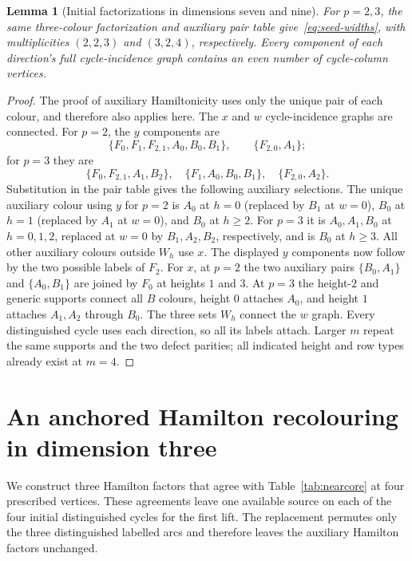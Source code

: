 \documentclass[11pt,reqno]{amsart}
\numberwithin{equation}{section}
\newtheorem{lemma}[theorem]{Lemma}
\theoremstyle{definition}
\theoremstyle{remark}
\begin{document}
\begin{lemma}[Initial factorizations in dimensions seven and nine]\label{lem:small-seed}
For $p=2,3$, the same three-colour factorization and auxiliary pair table
give~\eqref{eq:seed-widths}, with multiplicities $(2,2,3)$ and $(3,2,4)$,
respectively. Every component of each direction's full cycle-incidence graph
contains an even number of cycle-column vertices.
\end{lemma}
\begin{proof}
The proof of auxiliary Hamiltonicity uses only the unique pair of each colour,
and therefore also applies here. The $x$ and $w$ cycle-incidence graphs are connected.
For $p=2$, the $y$ components are
\[
 \{F_0,F_1,F_{2,1},A_0,B_0,B_1\},\qquad \{F_{2,0},A_1\};
\]
for $p=3$ they are
\[
 \{F_0,F_{2,1},A_1,B_2\},\quad
 \{F_1,A_0,B_0,B_1\},\quad \{F_{2,0},A_2\}.
\]
Substitution in the pair table gives the following auxiliary selections.
The unique auxiliary colour using $y$ for $p=2$ is $A_0$ at $h=0$
(replaced by $B_1$ at $w=0$), $B_0$ at $h=1$ (replaced by $A_1$ at $w=0$),
and $B_0$ at $h\ge2$. For $p=3$ it is $A_0,A_1,B_0$ at $h=0,1,2$, replaced at
$w=0$ by $B_1,A_2,B_2$, respectively, and is $B_0$ at $h\ge3$.
All other auxiliary colours outside $W_h$ use $x$. The displayed $y$ components
now follow by the two possible labels of $F_2$. For $x$, at $p=2$ the two
auxiliary pairs $\{B_0,A_1\}$ and $\{A_0,B_1\}$ are joined by $F_0$ at heights
$1$ and $3$. At $p=3$ the height-$2$ and generic supports connect all $B$ colours,
height $0$ attaches $A_0$, and height $1$ attaches $A_1,A_2$ through $B_0$.
The three sets $W_h$ connect the $w$ graph. Every distinguished cycle uses each direction,
so all its labels attach. Larger $m$ repeat the same supports and the two defect
parities; all indicated height and row types already exist at $m=4$.
\end{proof}

\section{An anchored Hamilton recolouring in dimension three}\label{sec:anchored}
We construct three Hamilton factors that agree with
Table~\ref{tab:nearcore} at four prescribed vertices. These agreements leave one
available source on each of the four initial distinguished cycles for the first
lift. The replacement permutes only the three distinguished labelled arcs and
therefore leaves the auxiliary Hamilton factors unchanged.
\end{document}
